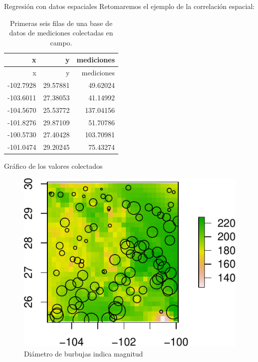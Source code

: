 \documentclass[
  11pt,
  ignorenonframetext,
]{beamer}
\begin{document}
\begin{frame}{Regresión con datos espaciales}
\protect\hypertarget{regresiuxf3n-con-datos-espaciales}{}
Retomaremos el ejemplo de la correlación espacial:

\begin{longtable}[]{@{}rrr@{}}
\caption{Primeras seis filas de una base de datos de mediciones
colectadas en campo.}\tabularnewline
\toprule()
x & y & mediciones \\
\midrule()
\endfirsthead
\toprule()
x & y & mediciones \\
\midrule()
\endhead
-102.7928 & 29.57881 & 49.62024 \\
-103.6011 & 27.38053 & 41.14992 \\
-104.5670 & 25.53772 & 137.04156 \\
-101.8276 & 29.87109 & 51.70786 \\
-100.5730 & 27.40428 & 103.70981 \\
-101.0474 & 29.20245 & 75.43274 \\
\bottomrule()
\end{longtable}
\end{frame}

\begin{frame}{Gráfico de los valores colectados}
\protect\hypertarget{gruxe1fico-de-los-valores-colectados}{}
\begin{figure}

{\centering \includegraphics{Regresion_files/figure-beamer/unnamed-chunk-9-1} 

}

\caption{Diámetro de burbujas indica magnitud}\label{fig:unnamed-chunk-9}
\end{figure}
\end{frame}
\end{document}
